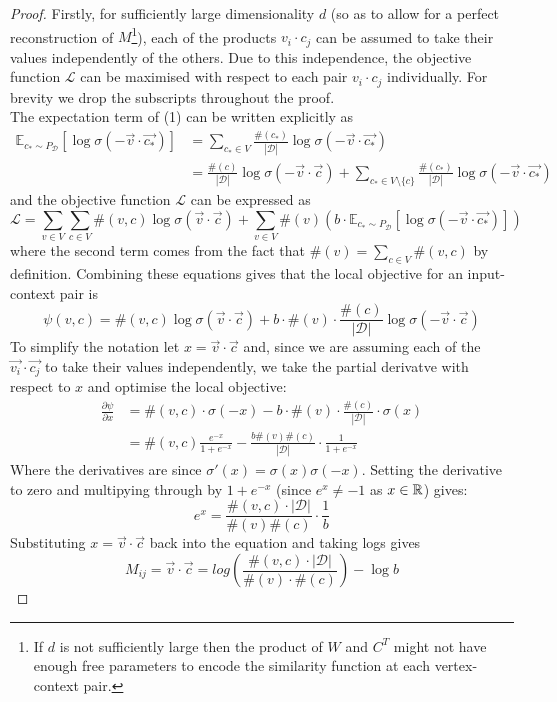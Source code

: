 \documentclass[a4paper]{article}
\renewcommand{\E}{\mathbb E}
\newcommand{\D}{\mathcal D}
\begin{document}
\begin{proof}
  Firstly, for sufficiently large dimensionality $d$ (so as to allow for a perfect
  reconstruction of $M$\footnote{If $d$ is not sufficiently large then the product of $W$ and $C^T$ might not have enough free parameters to encode the similarity function at each vertex-context pair.}), each of the products $v_i \cdot c_j$ can be assumed to
  take their values independently of the others. Due to this independence, the objective function $\mathcal{L}$ can be maximised with
  respect to each pair $v_i \cdot c_j$ individually. For brevity we drop the subscripts throughout the proof.\\
  The expectation term of (1) can be written explicitly as
  \begin{align*}
    \E_{c_* \sim P_{\D}}[\log{\sigma(-\vec{v} \cdot \vec{c_*})}] &= \sum_{c_* \in V}{\frac{\#(c_*)}{|\D|} \log{\sigma(-\vec{v} \cdot \vec{c_*})}}\\
                                                                             &= \frac{\#(c)}{|\D|} \log{\sigma(-\vec{v} \cdot \vec{c})} + \sum_{c_*\in V \setminus \{c\}}{\frac{\#(c_*)}{|\D|} \log{\sigma(-\vec{v} \cdot \vec{c_*})}}
  \end{align*}
  and the objective function $\mathcal{L}$ can be expressed as
  \begin{equation*}
    \mathcal{L} =  \sum_{v \in V}\sum_{c \in V}\#(v, c)\log{\sigma(\vec{v} \cdot \vec{c})} + \sum_{v \in V}\#(v)\left(b \cdot \E_{c _* \sim P_{\D}}[\log{\sigma(-\vec{v} \cdot \vec{c_*})}] \right)
  \end{equation*}
  where the second term comes from the fact that $\#(v) = \sum_{c \in V}\#(v,c)$
  by definition. Combining these equations gives that the local objective for an input-context
  pair is
  \begin{equation*}
    \psi(v, c) = \#(v, c)\log{\sigma(\vec{v} \cdot \vec{c})} + b \cdot \#(v)\cdot \frac{\#(c)}{|\D|}\log{\sigma(-\vec{v} \cdot \vec{c})} 
  \end{equation*}
  To simplify the notation let $x = \vec{v} \cdot \vec{c}$ and, since we are
  assuming each of the $\vec{v_i} \cdot \vec{c_j}$ to take their values
  independently, we take the partial derivatve with respect to $x$ and optimise
  the local objective:
  \begin{align*}
  \frac{\partial{\psi}}{\partial{x}} &= \#(v, c) \cdot \sigma(-x) - b \cdot
    \#(v) \cdot \frac{\#(c)}{|\D|} \cdot \sigma(x)\\
    &= \#(v,c)\frac{e^{-x}}{1+e^{-x}} -\frac{b\#(v)\#(c)}{|\D|} \cdot \frac{1}{1+e^{-x}}
  \end{align*}
  Where the derivatives are since $\sigma'(x) = \sigma(x)\sigma(-x)$. Setting
  the derivative to zero and multipying through by
  $1+e^{-x}$ (since $e^{x} \neq -1$ as $x \in \R$) gives:
  \[e^x = \frac{\#(v,c) \cdot |\D|}{\#(v)\#(c)} \cdot \frac{1}{b}\]
  Substituting $x = \vec{v} \cdot \vec{c}$ back into the equation and taking
  logs gives
  \[M_{ij} = \vec{v} \cdot \vec{c} = log{\left( \frac{\#(v, c) \cdot |\D|}{\#(v) \cdot
          \#(c)} \right)} - \log{b}\]
\end{proof}
\end{document}

